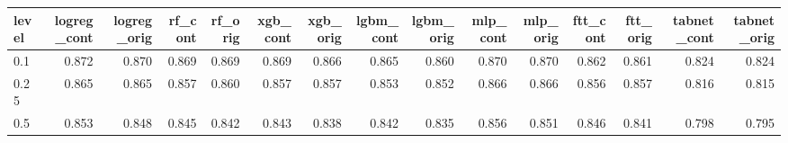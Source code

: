 \begin{tabular}{lrrrrrrrrrrrrrr}
\toprule
level & logreg\_cont & logreg\_orig & rf\_cont & rf\_orig & xgb\_cont & xgb\_orig & lgbm\_cont & lgbm\_orig & mlp\_cont & mlp\_orig & ftt\_cont & ftt\_orig & tabnet\_cont & tabnet\_orig \\
\midrule
0.1 & 0.872 & 0.870 & 0.869 & 0.869 & 0.869 & 0.866 & 0.865 & 0.860 & 0.870 & 0.870 & 0.862 & 0.861 & 0.824 & 0.824 \\
0.25 & 0.865 & 0.865 & 0.857 & 0.860 & 0.857 & 0.857 & 0.853 & 0.852 & 0.866 & 0.866 & 0.856 & 0.857 & 0.816 & 0.815 \\
0.5 & 0.853 & 0.848 & 0.845 & 0.842 & 0.843 & 0.838 & 0.842 & 0.835 & 0.856 & 0.851 & 0.846 & 0.841 & 0.798 & 0.795 \\
\bottomrule
\end{tabular}
